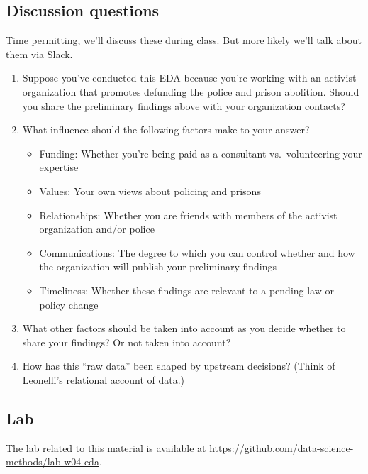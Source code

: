 \documentclass[
]{article}
\providecommand{\tightlist}{%
  \setlength{\itemsep}{0pt}\setlength{\parskip}{0pt}}
\begin{document}
\hypertarget{discussion-questions-1}{%
\subsection{Discussion questions}\label{discussion-questions-1}}

Time permitting, we'll discuss these during class. But more likely we'll talk about them via Slack.

\begin{enumerate}
\def\labelenumi{\arabic{enumi}.}
\item
  Suppose you've conducted this EDA because you're working with an activist organization that promotes defunding the police and prison abolition. Should you share the preliminary findings above with your organization contacts?
\item
  What influence should the following factors make to your answer?

  \begin{itemize}
  \tightlist
  \item
    Funding: Whether you're being paid as a consultant vs.~volunteering your expertise
  \item
    Values: Your own views about policing and prisons
  \item
    Relationships: Whether you are friends with members of the activist organization and/or police
  \item
    Communications: The degree to which you can control whether and how the organization will publish your preliminary findings
  \item
    Timeliness: Whether these findings are relevant to a pending law or policy change
  \end{itemize}
\item
  What other factors should be taken into account as you decide whether to share your findings? Or not taken into account?
\item
  How has this ``raw data'' been shaped by upstream decisions? (Think of Leonelli's relational account of data.)
\end{enumerate}

\hypertarget{lab-1}{%
\subsection{Lab}\label{lab-1}}

The lab related to this material is available at \url{https://github.com/data-science-methods/lab-w04-eda}.
\end{document}
